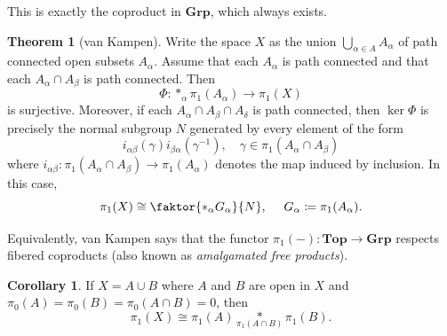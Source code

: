 \documentclass[10pt,letterpaper,cm]{nupset}
\theoremstyle{definition}
\theoremstyle{theorem}
\newtheorem{theorem}[definition]{Theorem}
\newtheorem{corollary}[definition]{Corollary}
\theoremstyle{remark}
\newcommand{\1}{\mathbb{1}}
\newcommand{\0}{\vec 0}
\begin{document}
\smallskip

This is exactly the coproduct in $\mathbf{Grp}$, which always exists.


\begin{theorem}[van Kampen]
Write the space $X$ as the union $\bigcup_{\alpha \in A} A_{\alpha}$ of path connected open subsets $A_{\alpha}$. Assume that each $A_{\alpha}$ is path connected and that each $A_{\alpha} \cap A_{\beta}$ is path connected. Then $$\Phi : \ast_{\alpha} \pi_1(A_{\alpha}) \to \pi_1(X)$$ is surjective. Moreover, if each $A_{\alpha} \cap A_{\beta} \cap A_{\delta}$ is path connected, then $\ker{\Phi}$ is precisely the normal subgroup $N$ generated by every element of the form $$ i_{\alpha \beta} (\gamma ) i_{\beta \alpha}(\gamma^{-1}), \quad \gamma \in \pi_1(A_{\alpha} \cap A_{\beta})$$ where $i_{\alpha \beta} : \pi_1(A_{\alpha} \cap A_{\beta}) \to \pi_1(A_{\alpha})$ denotes the map induced by inclusion.  In this case, $$\pi_1(X) \cong \faktor{\ast_{\alpha} G_{\alpha}}{N}, \ \quad G_{\alpha} \coloneqq  \pi_1(A_{\alpha}).$$
\end{theorem}


Equivalently, van Kampen says that the functor $\pi_1(-) : \mathbf{Top} \to \mathbf{Grp}$ respects fibered coproducts (also known as \textit{amalgamated free products}).

\smallskip

\begin{corollary}
If $X = A \cup B$ where $A$ and $B$ are open in $X$ and $\pi_0(A) = \pi_0(B) = \pi_0(A \cap B) = 0$, then $$\pi_1(X) \cong \pi_1(A) \underset{\pi_1(A\cap B)}{\ast} \pi_1(B).  $$
\end{corollary}
\end{document}
